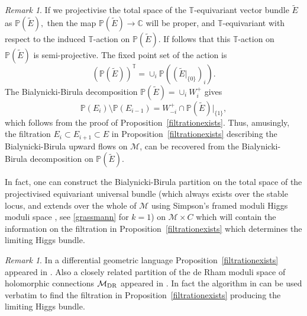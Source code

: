 \documentclass[12pt]{article}
\numberwithin{equation}{section}
\theoremstyle{remark}
\newtheorem{remark}[theorem]{Remark}
\theoremstyle{definition}
\numberwithin{theorem}{section}
\def\C{\mathbb{C}}
\def\M{{\mathcal{M}}}
\newcommand{\T}{{\mathbb{T}}}
\renewcommand{\1}{\mathbbm{1}}
\begin{document}
\begin{remark}\label{bbonpe} If we projectivise the total space of the $\T$-equivariant vector bundle $\tilde{E}$ as  ${\mathbb P}(\tilde{E}),$ then the map ${\mathbb P}(\tilde{E})\to \C$ will be proper, and $\T$-equivariant with respect to the induced $\T$-action on ${\mathbb P}(\tilde{E})$. If follows that this  $\T$-action on ${\mathbb P}(\tilde{E})$ is semi-projective. The fixed point set of the action is $$({\mathbb P}(\tilde{E}))^\T=\cup_i {\mathbb P}((\tilde{E}|_{\{0\}})_i).$$ The Bialynicki-Birula decomposition ${\mathbb P}(\tilde{E})=\cup_i W^+_i$ gives   $${\mathbb P}(E_i)\setminus {\mathbb P}(E_{i-1}) = W^+_{-i}\cap {\mathbb P}(\tilde{E})|_{\{1\}},$$ which follows from  the  proof of Proposition~\ref{filtrationexists}. Thus, amusingly, the filtration $E_i\subset E_{i+1}\subset E$ in Proposition~\ref{filtrationexists} describing the Bialynicki-Birula upward flows on $\M$, can be recovered from the Bialynicki-Birula decomposition on ${\mathbb P}(\tilde{E})$.
	
	In fact, one can construct the Bialynicki-Birula partition on the total space of the projectivised equivariant universal bundle (which always exists over the stable locus, and extends over the whole of $\M$ using Simpson's framed moduli Higgs moduli space \cite[Theorem 4.10]{simpson1}, see \eqref{grassmann} for $k=1$) on $\M\times C$ which will contain the information on the filtration in Proposition~\ref{filtrationexists} which determines the limiting  Higgs bundle. 
\end{remark}

\begin{remark}   In a differential geometric language Proposition~\ref{filtrationexists} appeared  in \cite[Proposition 4.2]{collier-wentworth}. Also a closely related partition of the de Rham moduli space of holomorphic connections $\M_{\rm DR}$ appeared in \cite{simpson}. In fact the algorithm in \cite{simpson} can be used verbatim to find the filtration in Proposition~\ref{filtrationexists} producing the limiting Higgs bundle. 
\end{remark}
\end{document}
